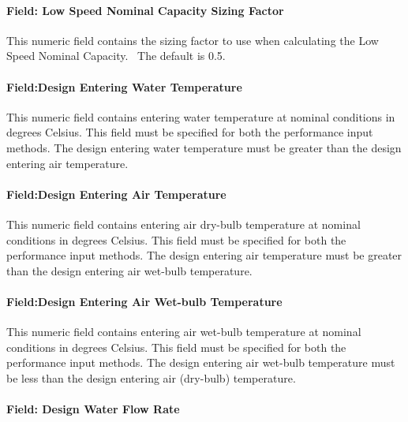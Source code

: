 \paragraph{Field: Low Speed Nominal Capacity Sizing Factor}\label{field-low-speed-nominal-capacity-sizing-factor-1}

This numeric field contains the sizing factor to use when calculating the Low Speed Nominal Capacity.~ The default is 0.5.

\paragraph{Field:Design Entering Water Temperature}\label{fielddesign-entering-water-temperature-3}

This numeric field contains entering water temperature at nominal conditions in degrees Celsius. This field must be specified for both the performance input methods. The design entering water temperature must be greater than the design entering air temperature.

\paragraph{Field:Design Entering Air Temperature}\label{fielddesign-entering-air-temperature-3}

This numeric field contains entering air dry-bulb temperature at nominal conditions in degrees Celsius. This field must be specified for both the performance input methods. The design entering air temperature must be greater than the design entering air wet-bulb temperature.

\paragraph{Field:Design Entering Air Wet-bulb Temperature}\label{fielddesign-entering-air-wet-bulb-temperature-3}

This numeric field contains entering air wet-bulb temperature at nominal conditions in degrees Celsius. This field must be specified for both the performance input methods. The design entering air wet-bulb temperature must be less than the design entering air (dry-bulb) temperature.

\paragraph{Field: Design Water Flow Rate}\label{field-design-water-flow-rate-7}


